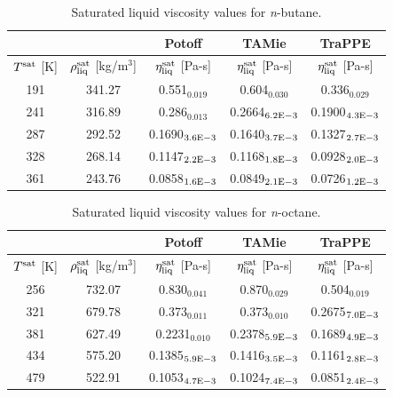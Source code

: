 \documentclass[preprint,review,12pt]{elsarticle}
\begin{document}
	\begin{table}[H]
		\caption{Saturated liquid viscosity values for \textit{n}-butane.}
		\begin{center}
			\begin{tabular}{|c|c|c|c|c|}
				\hline
				&                                       & Potoff            & TAMie             & TraPPE            \\ \hline
				$T^{\rm sat}$ {[}K{]} & $\rho^{\rm sat}_{\rm liq}$ [kg/m$^3$] & $\eta_{\rm liq}^{\rm sat}$ {[}Pa-s{]} & $\eta_{\rm liq}^{\rm sat}$ {[}Pa-s{]} & $\eta_{\rm liq}^{\rm sat}$ {[}Pa-s{]} \\ \hline
				191 & 341.27 & 0.551$_{0.019}$   & 0.604$_{0.030}$   & 0.336$_{0.029}$   \\ \hline
				241 & 316.89 & 0.286$_{0.013}$   & 0.2664$_{6.2 \rm E-3}$ & 0.1900$_{4.3 \rm E-3}$ \\ \hline
				287 & 292.52 & 0.1690$_{3.6 \rm E-3}$ & 0.1640$_{3.7 \rm E-3}$ & 0.1327$_{2.7 \rm E-3}$ \\ \hline
				328 & 268.14 & 0.1147$_{2.2 \rm E-3}$ & 0.1168$_{1.8 \rm E-3}$ & 0.0928$_{2.0 \rm E-3}$ \\ \hline
				361 & 243.76 & 0.0858$_{1.6 \rm E-3}$ & 0.0849$_{2.1 \rm E-3}$ & 0.0726$_{1.2 \rm E-3}$ \\ \hline
			\end{tabular}
		\end{center}
	\end{table}
	
	\begin{table}[H]
		\caption{Saturated liquid viscosity values for \textit{n}-octane.}
		\begin{center}
			\begin{tabular}{|c|c|c|c|c|}
				\hline
				&                                       & Potoff            & TAMie             & TraPPE            \\ \hline
				$T^{\rm sat}$ {[}K{]} & $\rho^{\rm sat}_{\rm liq}$ [kg/m$^3$] & $\eta_{\rm liq}^{\rm sat}$ {[}Pa-s{]} & $\eta_{\rm liq}^{\rm sat}$ {[}Pa-s{]} & $\eta_{\rm liq}^{\rm sat}$ {[}Pa-s{]} \\ \hline
				256 & 732.07 & 0.830$_{0.041}$   & 0.870$_{0.029}$   & 0.504$_{0.019}$   \\ \hline
				321 & 679.78 & 0.373$_{0.011}$   & 0.373$_{0.010}$   & 0.2675$_{7.0 \rm E-3}$ \\ \hline
				381 & 627.49 & 0.2231$_{0.010}$  & 0.2378$_{5.9 \rm E-3}$ & 0.1689$_{4.9 \rm E-3}$ \\ \hline
				434 & 575.20 & 0.1385$_{5.9 \rm E-3}$ & 0.1416$_{3.5 \rm E-3}$ & 0.1161$_{2.8 \rm E-3}$ \\ \hline
				479 & 522.91 & 0.1053$_{4.7 \rm E-3}$ & 0.1024$_{7.4 \rm E-3}$ & 0.0851$_{2.4 \rm E-3}$ \\ \hline
			\end{tabular}
		\end{center}
	\end{table}
	
\end{document}
